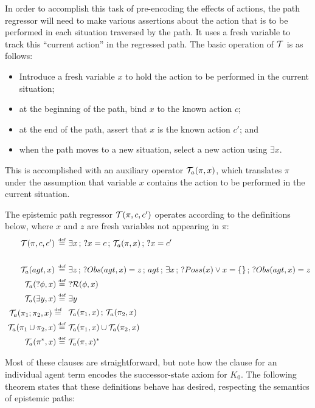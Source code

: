 In order to accomplish this task of pre-encoding the effects of actions,
the path regressor will need to make various assertions about the
action that is to be performed in each situation traversed by the
path. It uses a fresh variable to track this {}``current action''
in the regressed path. The basic operation of $\mathcal{T}$ is as follows:\newpage{}

\begin{itemize}
\item Introduce a fresh variable $x$ to hold the action to be performed
in the current situation;
\item at the beginning of the path, bind $x$ to the known action $c$;
\item at the end of the path, assert that $x$ is the known action $c'$;
and
\item when the path moves to a new situation, select a new action using
$\exists x$.
\end{itemize}
This is accomplished with an auxiliary operator $\mathcal{T}_{a}(\pi,x)$, which
translates $\pi$ under the assumption that variable $x$ contains
the action to be performed in the current situation. 

\begin{defnL}
 The
epistemic path regressor $\mathcal{T}(\pi,c,c')$ operates according to the
definitions below, where $x$ and $z$ are fresh variables not appearing
in $\pi$:\begin{align*}
\mathcal{T}(\pi,c,c')\,\stackrel{\mbox{\tiny def}}{=}\,\, & \exists x\,;\,?x=c\,;\,\mathcal{T}_{a}(\pi,x)\,;\,?x=c'\\
\\\mathcal{T}_{a}(agt,x)\,\stackrel{\mbox{\tiny def}}{=}\,\, & \exists z\,;\,?Obs(agt,x)=z\,;\, agt\,;\,\exists x\,;\,?Poss(x)\vee x=\{\}\,;\,?Obs(agt,x)=z\\
\mathcal{T}_{a}(?\phi,x)\stackrel{\mbox{\tiny def}}{=}\,\, & ?\mathcal{R}(\phi,x)\\
\mathcal{T}_{a}(\exists y,x)\stackrel{\mbox{\tiny def}}{=}\,\, & \exists y\\
\begin{array}{c}
\mathcal{T}_{a}(\pi_{1};\pi_{2},x)\stackrel{\mbox{\tiny def}}{=}\,\,\end{array} & \mathcal{T}_{a}(\pi_{1},x)\,;\,\mathcal{T}_{a}(\pi_{2},x)\\
\mathcal{T}_{a}(\pi_{1}\cup\pi_{2},x)\stackrel{\mbox{\tiny def}}{=}\,\, & \mathcal{T}_{a}(\pi_{1},x)\cup\mathcal{T}_{a}(\pi_{2},x)\\
\mathcal{T}_{a}(\pi^{*},x)\stackrel{\mbox{\tiny def}}{=}\,\, & \mathcal{T}_{a}(\pi,x)^{*}\end{align*}

\end{defnL}
Most of these clauses are straightforward, but note how the clause
for an individual agent term encodes the successor-state axiom for
$K_{0}$. The following theorem states that these definitions behave
has desired, respecting the semantics of epistemic paths:

